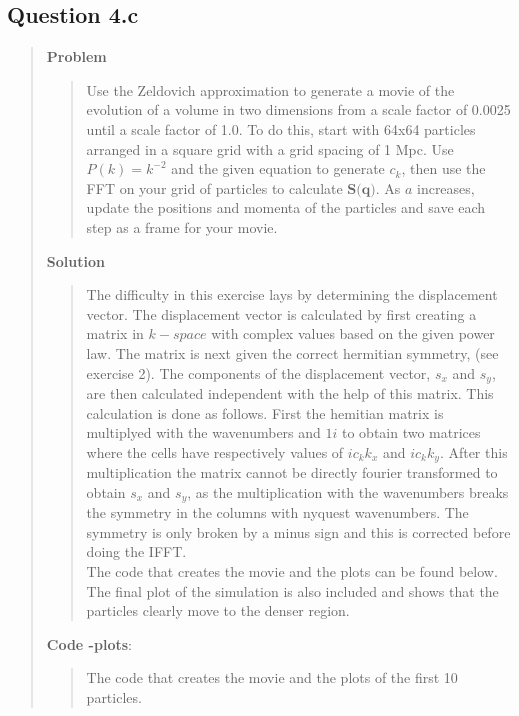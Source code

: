 
\subsection*{\textbf{Question 4.c}}
\begin{quote}

\textbf{Problem}
\begin{quote} 
Use the Zeldovich approximation to generate a movie of the evolution of a volume in two dimensions
from a scale factor of 0.0025 until a scale factor of 1.0. To do this, start with 64x64 particles arranged in a square grid with a grid spacing of 1 Mpc. Use $P(k) = k^{-2}$ and the given equation to generate $c_k$, then use the FFT on your grid of particles to calculate $\textbf{S(q)}$. As $a$ increases, update the positions and momenta of the particles and save each step as a frame for your movie. 
\end{quote}

\textbf{Solution} 
\begin{quote}
The difficulty in this exercise lays by determining the displacement vector. The displacement vector is calculated by first creating a matrix in $k-space$ with complex values based on the given power law. The matrix is next given the correct hermitian symmetry, (see exercise 2). The components of the displacement vector, $s_x$ and $s_y$, are then calculated independent with the help of this matrix.  This calculation is done as follows. First the hemitian matrix is multiplyed with the wavenumbers and $1i$ to obtain two matrices where the cells have respectively values of $ic_k k_x$ and $ic_k k_y$. After this multiplication the matrix cannot be directly fourier transformed to obtain $s_x$ and $s_y$, as the multiplication with the wavenumbers breaks the symmetry in the columns with nyquest wavenumbers. The symmetry is only broken by a minus sign and this is corrected before doing the IFFT. 
\\
The code that creates the movie and the plots can be found below. The final plot of the simulation is also included and shows that the particles clearly move to the denser region.

\end{quote}

\textbf{Code -plots}:
\begin{quote}

The code that creates the movie and the plots of the first 10 particles. 

\end{quote}


\end{quote}

